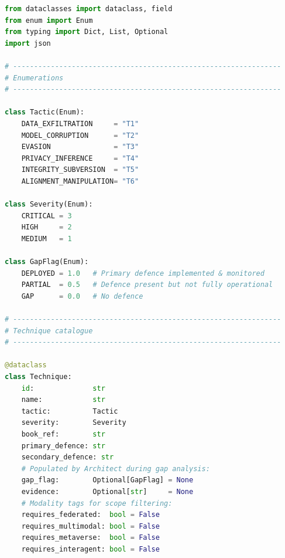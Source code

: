 \begin{lstlisting}[language=Python, style=pythonstyle,
  caption={ATTM Gap Analyser: scores deployment coverage against the
           28-technique AI Trust Threat Matrix and generates a
           prioritised remediation report.},
  label={lst:attm-gap-analyser}]
from dataclasses import dataclass, field
from enum import Enum
from typing import Dict, List, Optional
import json

# ----------------------------------------------------------------
# Enumerations
# ----------------------------------------------------------------

class Tactic(Enum):
    DATA_EXFILTRATION     = "T1"
    MODEL_CORRUPTION      = "T2"
    EVASION               = "T3"
    PRIVACY_INFERENCE     = "T4"
    INTEGRITY_SUBVERSION  = "T5"
    ALIGNMENT_MANIPULATION= "T6"

class Severity(Enum):
    CRITICAL = 3
    HIGH     = 2
    MEDIUM   = 1

class GapFlag(Enum):
    DEPLOYED = 1.0   # Primary defence implemented & monitored
    PARTIAL  = 0.5   # Defence present but not fully operational
    GAP      = 0.0   # No defence

# ----------------------------------------------------------------
# Technique catalogue
# ----------------------------------------------------------------

@dataclass
class Technique:
    id:              str
    name:            str
    tactic:          Tactic
    severity:        Severity
    book_ref:        str
    primary_defence: str
    secondary_defence: str
    # Populated by Architect during gap analysis:
    gap_flag:        Optional[GapFlag] = None
    evidence:        Optional[str]     = None
    # Modality tags for scope filtering:
    requires_federated:  bool = False
    requires_multimodal: bool = False
    requires_metaverse:  bool = False
    requires_interagent: bool = False


\end{lstlisting}
